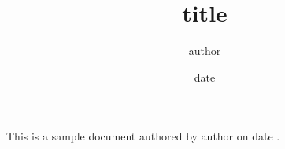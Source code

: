 \documentclass{article}
\title{{{ title }}}
\author{{{ author }}}
\date{{{ date }}}
\begin{document}
\maketitle

This is a sample document authored by {{ author }} on {{ date }}.
\end{document}

